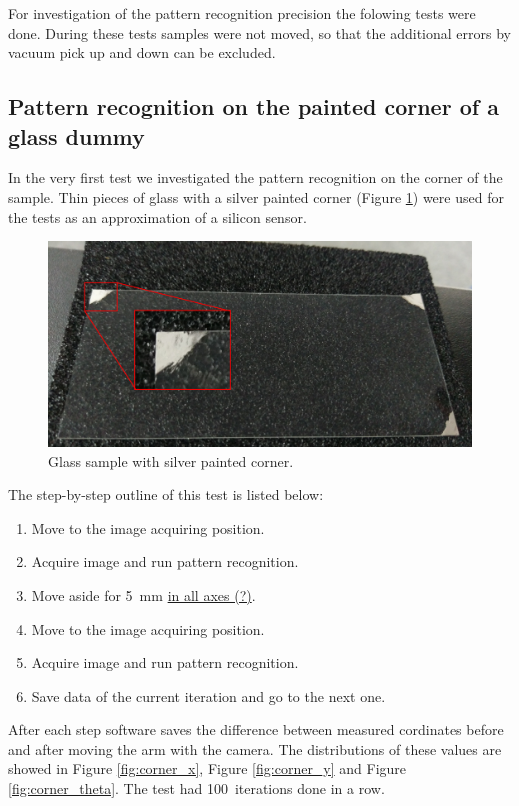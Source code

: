 For investigation of the pattern recognition precision the folowing tests were done. During these tests samples were not moved, so that the additional errors by vacuum pick up and down can be excluded.
\subsection{Pattern recognition on the painted corner of a glass dummy}
In the very first test we investigated the pattern recognition on the corner of the sample. Thin pieces of glass with a silver painted corner (Figure \ref{fig:painted_corner}) were used for the tests as an approximation of a silicon sensor.

\begin{figure}[ht]\centering
\includegraphics[width=0.8\linewidth]{Data/Precision_tests/Painted_corner.png}
\caption{Glass sample with silver painted corner.}
\label{fig:painted_corner}
\end{figure}

The step-by-step outline of this test is listed below:
\begin{enumerate}
\item Move to the image acquiring position.
\item Acquire image and run pattern recognition.
\item Move aside for 5~mm \underline{in all axes (?)}.
\item Move to the image acquiring position.
\item Acquire image and run pattern recognition.
\item Save data of the current iteration and go to the next one.
\end{enumerate}

After each step software saves the difference between measured cordinates before and after moving the arm with the camera. The distributions of these values are showed in Figure \ref{fig:corner_x}, Figure \ref{fig:corner_y} and Figure \ref{fig:corner_theta}. The test had 100~iterations done in a row.

